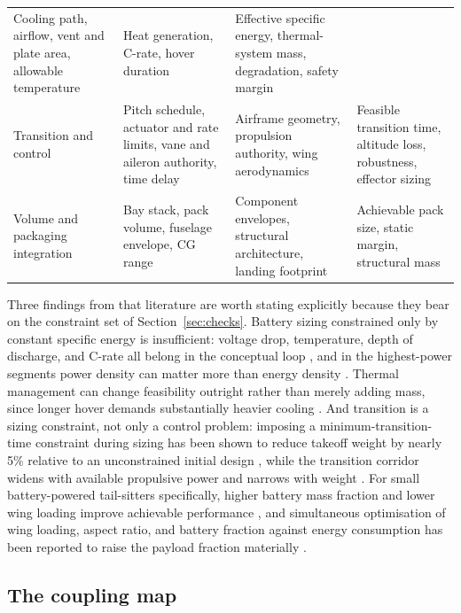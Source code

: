 \begin{table}[htbp]
\begin{tabularx}{\textwidth}{@{}lXXX@{}}
Cooling path, airflow, vent and plate area, allowable temperature &
Heat generation, C-rate, hover duration
\citep{park2024,zhao2024thermal} &
Effective specific energy, thermal-system mass, degradation, safety
margin \citep{park2024,zhao2024thermal} \\
\addlinespace
Transition and control &
Pitch schedule, actuator and rate limits, vane and aileron authority,
time delay &
Airframe geometry, propulsion authority, wing aerodynamics
\citep{zhong2021,mcintosh2024,li2020} &
Feasible transition time, altitude loss, robustness, effector sizing
\citep{li2020,cong2024,banazadeh2016,marvakov2021} \\
\addlinespace
Volume and packaging integration &
Bay stack, pack volume, fuselage envelope, CG range &
Component envelopes, structural architecture, landing footprint
\citep{lee2020,govindarajan2018} &
Achievable pack size, static margin, structural mass
\citep{ugwueze2023} \\
\bottomrule
\end{tabularx}
\end{table}

Three findings from that literature are worth stating explicitly
because they bear on the constraint set of
Section~\ref{sec:checks}. Battery sizing constrained only by constant
specific energy is insufficient: voltage drop, temperature, depth of
discharge, and C-rate all belong in the conceptual loop
\citep{park2024}, and in the highest-power segments power density can
matter more than energy density \citep{thu2025}. Thermal management can
change feasibility outright rather than merely adding mass, since longer
hover demands substantially heavier cooling \citep{zhao2024thermal}.
And transition is a sizing constraint, not only a control problem:
imposing a minimum-transition-time constraint during sizing has been
shown to reduce takeoff weight by nearly 5\% relative to an unconstrained
initial design \citep{cong2024}, while the transition corridor widens
with available propulsive power and narrows with weight
\citep{tang2018,zhong2021}. For small battery-powered tail-sitters
specifically, higher battery mass fraction and lower wing loading
improve achievable performance \citep{wang2016}, and simultaneous
optimisation of wing loading, aspect ratio, and battery fraction against
energy consumption has been reported to raise the payload fraction
materially \citep{cinar2023}.

\subsection{The coupling map}
\label{sec:coupling}

